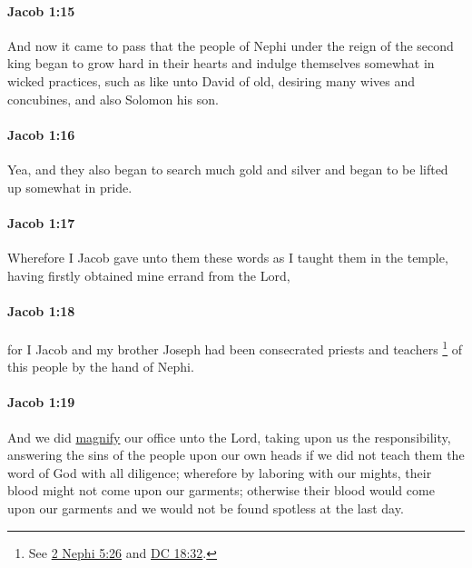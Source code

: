 		\paragraph{Jacob 1:15} %
			\label{JACOB-1-15}

			And now it came to pass that
			the people of Nephi under the reign of the second king
			began to grow hard in their hearts
			and indulge themselves somewhat in wicked practices,
			such as like unto David of old,
			desiring many wives and concubines,
			and also Solomon his son.

		\paragraph{Jacob 1:16} %
			\label{JACOB-1-16}

			Yea, and they also began to search much gold and silver
			and began to be lifted up somewhat in pride.

		\paragraph{Jacob 1:17} %
			\label{JACOB-1-17}

			Wherefore I Jacob gave unto them these words as I taught them in the temple,
			having firstly obtained mine errand from the Lord,

		\paragraph{Jacob 1:18} %
			\label{JACOB-1-18}

			for I Jacob and my brother Joseph had been consecrated
			priests and teachers%
				\footnote{%
					See \hyperref[2NEPHI-5-26]{2 Nephi 5:26} and \hyperref[DC18-32]{DC 18:32}.
					}
			of this people by the hand of Nephi.

		\paragraph{Jacob 1:19} %
			\label{JACOB-1-19}

			And we did \hyperref[MAGNIFY]{magnify} our office unto the Lord,
			taking upon us the responsibility,
			answering the sins of the people upon our own heads
			if we did not teach them the word of God with all diligence;
			wherefore by laboring with our mights,
			their blood might not come upon our garments;
			otherwise their blood would come upon our garments
			and we would not be found spotless at the last day.
			
